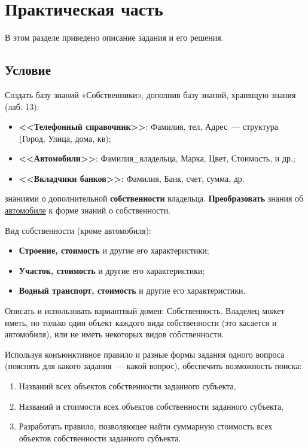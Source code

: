 \chapter{Практическая часть}
В этом разделе приведено описание задания и его решения.

\section{Условие}
Создать базу знаний «Собственники», дополнив базу знаний, хранящую знания (лаб. 13):
\begin{itemize}
    \item \textbf{<<Телефонный справочник>>}: Фамилия, \textnumero{}тел, Адрес~--- структура (Город, Улица, \textnumero{}дома, \textnumero{}кв);
    \item \textbf{<<Автомобили>>}:  Фамилия\_владельца, Марка, Цвет, Стоимость, и др.;
    \item \textbf{<<Вкладчики банков>>}: Фамилия, Банк, счет, сумма, др.
\end{itemize}
знаниями о дополнительной \textbf{собственности} владельца. \textbf{Преобразовать} знания об \underline{автомобиле} к форме знаний о собственности.

Вид собственности (кроме автомобиля):
\begin{itemize}
    \item \textbf{Строение, стоимость} и другие его характеристики;
        \item \textbf{Участок, стоимость} и другие его характеристики;
        \item \textbf{Водный транспорт, стоимость} и другие его характеристики.
\end{itemize}

Описать и использовать вариантный домен: Собственность. Владелец может иметь, но только один объект каждого вида собственности (это касается и автомобиля), или не иметь некоторых видов собственности.

Используя конъюнктивное правило и разные формы задания одного вопроса (пояснять для какого \textnumero{}задания~--- какой вопрос), обеспечить возможность поиска:
\begin{enumerate}
    \item Названий всех объектов собственности заданного субъекта,
    \item Названий и стоимости всех объектов собственности заданного субъекта,
    \item Разработать правило, позволяющее найти суммарную стоимость всех объектов собственности заданного субъекта.
\end{enumerate}

